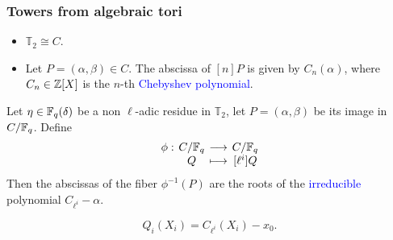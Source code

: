 \documentclass[12pt]{beamer}
\begin{document}
\begin{frame}
	\frametitle{Towers from algebraic tori}
	
	\begin{lemma}
		\begin{itemize}
			\item $\mathbb{T}_2 \cong C$.
			\item Let $P=(\alpha,\beta) \in C$. The abscissa of $[n]P$ is given by $C_n(\alpha)$, where $C_n\in\mathbb{Z}[X]$ is the $n$-th \textcolor{blue}{Chebyshev polynomial}.
		\end{itemize}
	\end{lemma}
	
	\begin{theorem}
		\label{th:T2-irred}
		Let $\eta\in\mathbb{F}_q(\delta)$ be a non $\ell$-adic residue in $\mathbb{T}_2$,
		let $P=(\alpha,\beta)$ be its image in $C/\mathbb{F}_q$. Define
		\[
		\setlength{\arraycolsep}{2pt}
		\begin{array}{cccc}
			\phi: & C/\F_q & \longrightarrow & C/\F_q \\
			& Q & \longmapsto & [\ell^i]Q
		\end{array}
		\]
		Then the abscissas of the fiber $\phi^{-1}(P)$ are the roots of the \textcolor{blue}{irreducible} polynomial $C_{\ell^i}-\alpha$.
	\end{theorem}

	\begin{corollary}
		\begin{equation*}
			Q_i(X_i) = C_{\ell^i}(X_i) - x_0.
		\end{equation*}
	\end{corollary}
\end{frame}

\end{document}
